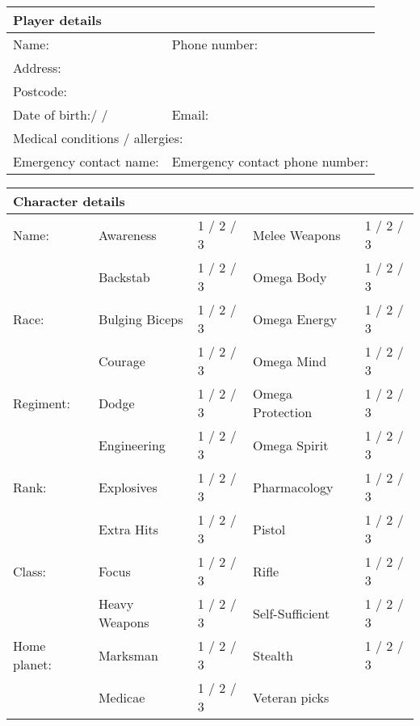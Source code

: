 \documentclass{scrbook}
\begin{document}
\begin{table}
\begin{tabular}{|l|l|} \hline 
\multicolumn{2}{|l|}{\textbf{Player details}} \\
 \hline Name: & Phone number: \\
 \hline \multicolumn{2}{|l|}{Address:} \\
 \hline \multicolumn{2}{|l|}{Postcode:} \\
 \hline  Date of birth:/	/ & Email: \\
 \hline \multicolumn{2}{|l|}{Medical conditions / allergies:} \\
 \hline Emergency contact name: & Emergency contact phone number: \\
 \hline \end{tabular}

\end{table}

\begin{table}
\begin{tabular}{|l|l|l|l|l|} \hline 
\multicolumn{5}{|l|}{\textbf{Character details}} \\
 \hline \multirow{1}{*}{Name:}& Awareness & 1 / 2 / 3 & Melee Weapons & 1 / 2 / 3 \\
\cline{2-2}\cline{3-3}\cline{4-4}\cline{5-5} & Backstab & 1 / 2 / 3 & Omega Body & 1 / 2 / 3 \\
 \hline \multirow{1}{*}{Race:}& Bulging Biceps & 1 / 2 / 3 & Omega Energy & 1 / 2 / 3 \\
\cline{2-2}\cline{3-3}\cline{4-4}\cline{5-5} & Courage & 1 / 2 / 3 & Omega Mind & 1 / 2 / 3 \\
 \hline \multirow{1}{*}{Regiment:}& Dodge & 1 / 2 / 3 & Omega Protection & 1 / 2 / 3 \\
\cline{2-2}\cline{3-3}\cline{4-4}\cline{5-5} & Engineering & 1 / 2 / 3 & Omega Spirit & 1 / 2 / 3 \\
 \hline \multirow{1}{*}{Rank:}& Explosives & 1 / 2 / 3 & Pharmacology & 1 / 2 / 3 \\
\cline{2-2}\cline{3-3}\cline{4-4}\cline{5-5} & Extra Hits & 1 / 2 / 3 & Pistol & 1 / 2 / 3 \\
 \hline \multirow{1}{*}{Class:}& Focus & 1 / 2 / 3 & Rifle & 1 / 2 / 3 \\
\cline{2-2}\cline{3-3}\cline{4-4}\cline{5-5} & Heavy Weapons & 1 / 2 / 3 & Self-Sufficient & 1 / 2 / 3 \\
 \hline \multirow{1}{*}{Home planet:}& Marksman & 1 / 2 / 3 & Stealth & 1 / 2 / 3 \\
\cline{2-2}\cline{3-3}\cline{4-4}\cline{5-5} & Medicae & 1 / 2 / 3 & Veteran picks &  \\
 \hline \end{tabular}

\end{table}
\end{document}
